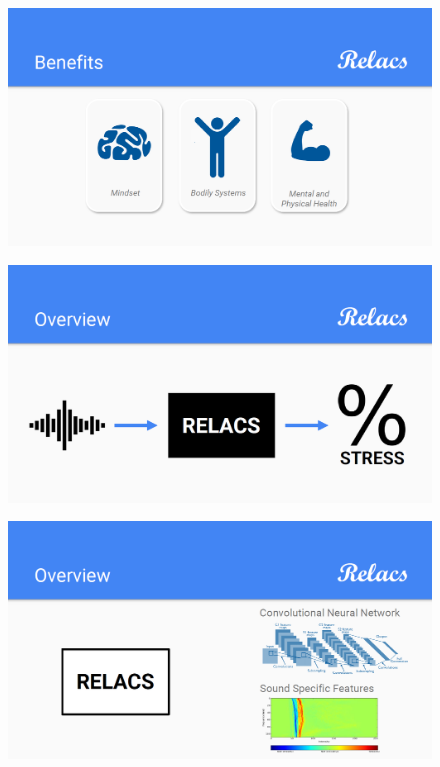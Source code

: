 \documentclass[a4paper]{article}
\begin{document}
\begin{figure}[h]
\centering
\includegraphics[width=\linewidth]{./Slide4}
\caption{}
\label{fig:Slide4}
\end{figure}

\begin{figure}[h]
\centering
\includegraphics[width=\linewidth]{./Slide5}
\caption{}
\label{fig:Slide5}
\end{figure}

\begin{figure}[h]
\centering
\includegraphics[width=\linewidth]{./Slide6}
\caption{}
\label{fig:Slide6}
\end{figure}
\end{document}
